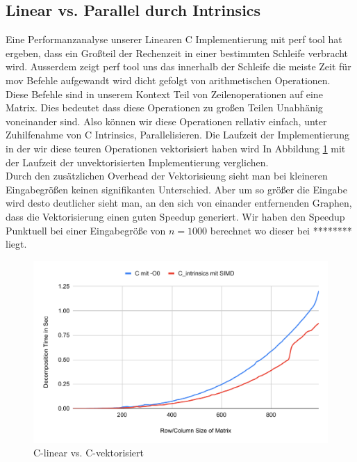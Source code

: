 \documentclass[course=erap]{aspdoc}
\begin{document}
\subsection{Linear vs. Parallel durch Intrinsics}
Eine Performanzanalyse unserer Linearen C Implementierung mit perf tool hat ergeben, dass ein Großteil der Rechenzeit in einer bestimmten Schleife verbracht wird. Ausserdem zeigt perf tool uns das innerhalb der
 Schleife die meiste Zeit für mov Befehle aufgewandt wird dicht gefolgt von arithmetischen Operationen. Diese Befehle sind in unserem Kontext Teil von Zeilenoperationen auf eine Matrix. Dies bedeutet dass diese Operationen zu 
 großen Teilen Unabhänig voneinander sind. Also können wir diese Operationen rellativ einfach, unter Zuhilfenahme von C Intrinsics, Parallelisieren.
 Die Laufzeit der Implementierung in der wir diese teuren Operationen vektorisiert haben wird In Abbildung \ref{CvsIntrins} mit der Laufzeit der unvektorisierten Implementierung verglichen. \\
Durch den zusätzlichen Overhead der Vektorisieung sieht man bei kleineren Eingabegrößen keinen signifikanten Unterschied. Aber um so größer die Eingabe wird desto deutlicher sieht man, an den sich von einander entfernenden 
Graphen, dass die Vektorisierung einen guten Speedup generiert. 
Wir haben den Speedup Punktuell bei einer Eingabegröße von $n = 1000$ berechnet wo dieser bei ******** liegt.\\
\begin{figure}[H]
\begin{center}
 \caption{C-linear vs. C-vektorisiert}
   \label{CvsIntrins}
 \includegraphics[width = 0.8\linewidth]{CvsIntrins.pdf}
\end{center}
\end{figure}
\end{document}
